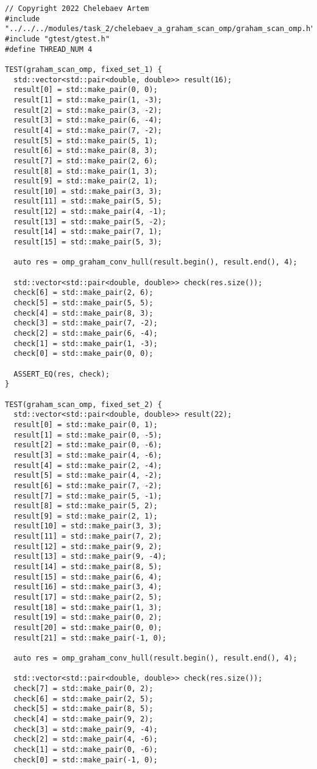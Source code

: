 \documentclass{report}
\begin{document}
\begin{lstlisting}
// Copyright 2022 Chelebaev Artem
#include "../../../modules/task_2/chelebaev_a_graham_scan_omp/graham_scan_omp.h"
#include "gtest/gtest.h"
#define THREAD_NUM 4

TEST(graham_scan_omp, fixed_set_1) {
  std::vector<std::pair<double, double>> result(16);
  result[0] = std::make_pair(0, 0);
  result[1] = std::make_pair(1, -3);
  result[2] = std::make_pair(3, -2);
  result[3] = std::make_pair(6, -4);
  result[4] = std::make_pair(7, -2);
  result[5] = std::make_pair(5, 1);
  result[6] = std::make_pair(8, 3);
  result[7] = std::make_pair(2, 6);
  result[8] = std::make_pair(1, 3);
  result[9] = std::make_pair(2, 1);
  result[10] = std::make_pair(3, 3);
  result[11] = std::make_pair(5, 5);
  result[12] = std::make_pair(4, -1);
  result[13] = std::make_pair(5, -2);
  result[14] = std::make_pair(7, 1);
  result[15] = std::make_pair(5, 3);

  auto res = omp_graham_conv_hull(result.begin(), result.end(), 4);

  std::vector<std::pair<double, double>> check(res.size());
  check[6] = std::make_pair(2, 6);
  check[5] = std::make_pair(5, 5);
  check[4] = std::make_pair(8, 3);
  check[3] = std::make_pair(7, -2);
  check[2] = std::make_pair(6, -4);
  check[1] = std::make_pair(1, -3);
  check[0] = std::make_pair(0, 0);

  ASSERT_EQ(res, check);
}

TEST(graham_scan_omp, fixed_set_2) {
  std::vector<std::pair<double, double>> result(22);
  result[0] = std::make_pair(0, 1);
  result[1] = std::make_pair(0, -5);
  result[2] = std::make_pair(0, -6);
  result[3] = std::make_pair(4, -6);
  result[4] = std::make_pair(2, -4);
  result[5] = std::make_pair(4, -2);
  result[6] = std::make_pair(7, -2);
  result[7] = std::make_pair(5, -1);
  result[8] = std::make_pair(5, 2);
  result[9] = std::make_pair(2, 1);
  result[10] = std::make_pair(3, 3);
  result[11] = std::make_pair(7, 2);
  result[12] = std::make_pair(9, 2);
  result[13] = std::make_pair(9, -4);
  result[14] = std::make_pair(8, 5);
  result[15] = std::make_pair(6, 4);
  result[16] = std::make_pair(3, 4);
  result[17] = std::make_pair(2, 5);
  result[18] = std::make_pair(1, 3);
  result[19] = std::make_pair(0, 2);
  result[20] = std::make_pair(0, 0);
  result[21] = std::make_pair(-1, 0);

  auto res = omp_graham_conv_hull(result.begin(), result.end(), 4);

  std::vector<std::pair<double, double>> check(res.size());
  check[7] = std::make_pair(0, 2);
  check[6] = std::make_pair(2, 5);
  check[5] = std::make_pair(8, 5);
  check[4] = std::make_pair(9, 2);
  check[3] = std::make_pair(9, -4);
  check[2] = std::make_pair(4, -6);
  check[1] = std::make_pair(0, -6);
  check[0] = std::make_pair(-1, 0);


\end{lstlisting}
\end{document}
